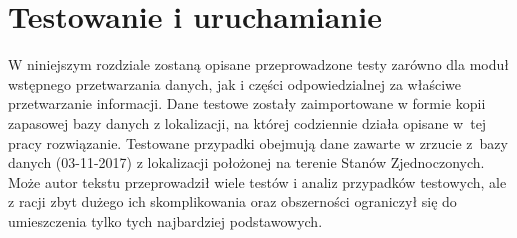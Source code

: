 \documentclass[a4paper]{book}
\begin{document}
\chapter{Testowanie i uruchamianie}
\label{rozdzial6}
W niniejszym rozdziale zostaną opisane przeprowadzone testy zarówno dla moduł wstępnego przetwarzania danych, jak i części odpowiedzialnej za właściwe przetwarzanie informacji. Dane testowe zostały zaimportowane w formie kopii zapasowej bazy danych z lokalizacji, na której codziennie działa opisane w~tej pracy rozwiązanie. Testowane przypadki obejmują dane zawarte w zrzucie z~bazy danych (03-11-2017) z lokalizacji położonej na terenie Stanów Zjednoczonych. Może autor tekstu przeprowadził wiele testów i analiz przypadków testowych, ale z racji zbyt dużego ich skomplikowania oraz obszerności ograniczył się do umieszczenia tylko tych najbardziej podstawowych. 
\end{document}
